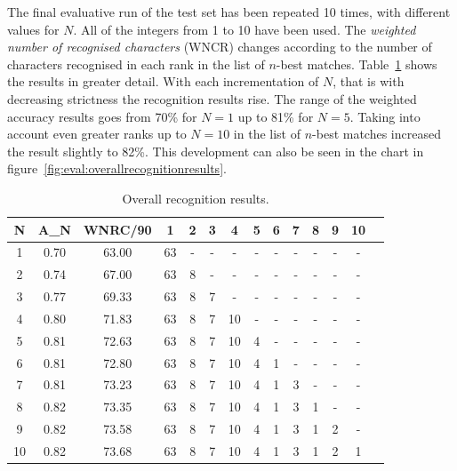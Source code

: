 The final evaluative run of the test set has been repeated 10 times, 
with different values for \(N\). All of the integers from 1 to 10 have
been used. The \emph{weighted number of recognised characters} (WNCR) changes 
according to the number of characters recognised in each rank in the
list of \(n\)-best matches. Table~\ref{table:eval:overallrecognitionresults}
shows the results in greater detail. With each incrementation of \(N\),
that is with decreasing strictness the recognition results rise.
The range of the weighted accuracy results goes from 70\% for \(N=1\) 
up to 81\% for \(N=5\). Taking into account even greater ranks up 
to \(N = 10\) in the list of \(n\)-best matches increased the result slightly
to 82\%. This development can also be seen in the chart in 
figure~\ref{fig:eval:overallrecognitionresults}.
\begin{table}[htbp]
\begin{center}
  \begin{tabular}{|c|c|c|c|c|c|c|c|c|c|c|c|c|p{200pt}|}
    \hline
N & A_N  &WNRC/90&  1 & 2 & 3 & 4  & 5 & 6 & 7 & 8 & 9 & 10 \\
    \hline
1 & 0.70 & 63.00 & 63 & - & - & -  & - & - & - & - & - & -  \\
    \hline
2 & 0.74 & 67.00 & 63 & 8 & - & -  & - & - & - & - & - & -  \\
    \hline
3 & 0.77 & 69.33 & 63 & 8 & 7 & -  & - & - & - & - & - & -  \\
    \hline
4 & 0.80 & 71.83 & 63 & 8 & 7 & 10 & - & - & - & - & - & -  \\
    \hline
5 & 0.81 & 72.63 & 63 & 8 & 7 & 10 & 4 & - & - & - & - & -  \\
    \hline
6 & 0.81 & 72.80 & 63 & 8 & 7 & 10 & 4 & 1 & - & - & - & -  \\
    \hline
7 & 0.81 & 73.23 & 63 & 8 & 7 & 10 & 4 & 1 & 3 & - & - & -  \\
    \hline
8 & 0.82 & 73.35 & 63 & 8 & 7 & 10 & 4 & 1 & 3 & 1 & - & -  \\
    \hline
9 & 0.82 & 73.58 & 63 & 8 & 7 & 10 & 4 & 1 & 3 & 1 & 2 & -  \\
    \hline
10& 0.82 & 73.68 & 63 & 8 & 7 & 10 & 4 & 1 & 3 & 1 & 2 & 1  \\
    \hline
  \end{tabular}
\end{center}
\caption{Overall recognition results.}
\label{table:eval:overallrecognitionresults}
\end{table}
